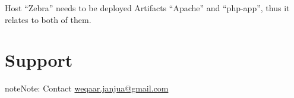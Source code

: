 \documentclass[letterpaper,10pt,english]{sphinxmanual}
\begin{document}
Host ``Zebra'' needs to be deployed Artifacts ``Apache'' and ``php-app'', thus it relates to both of them.


\chapter{Support}
\label{Support:support}\label{Support::doc}\label{Support:id1}
\begin{notice}{note}{Note:}
Contact \href{mailto:weqaar.janjua@gmail.com}{weqaar.janjua@gmail.com}
\end{notice}



\renewcommand{\indexname}{Index}
\printindex
\end{document}
